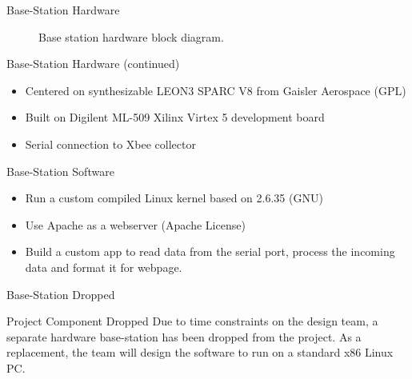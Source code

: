\documentclass{beamer}
\begin{document}
\begin{frame}{Base-Station Hardware}
	\begin{figure}[htbp]
	\begin{center}
	\caption{Base station hardware block diagram.}
	\label{fig:base_station_blocks}
	\end{center}
	\end{figure}
\end{frame}

\begin{frame}{Base-Station Hardware (continued)}
	\begin{itemize}
		\item <1 -> Centered on synthesizable LEON3 SPARC V8 from Gaisler Aerospace (GPL)
		\item <2 -> Built on Digilent ML-509 Xilinx Virtex 5 development board
		\item <3 -> Serial connection to Xbee collector
	\end{itemize}
\end{frame}

\begin{frame}{Base-Station Software}
	\begin{itemize}
		\item <1 -> Run a custom compiled Linux kernel based on 2.6.35 (GNU)
		\item <2 -> Use Apache as a webserver (Apache License)
		\item <3 -> Build a custom app to read data from the serial port, process the incoming data and format it for webpage.
	\end{itemize}
\end{frame}

\begin{frame}{Base-Station Dropped}
	\begin{alertblock}{Project Component Dropped}
		Due to time constraints on the design team, a separate hardware base-station has been dropped from the project. As a replacement, the team will design the software to run on a standard x86 Linux PC.
	\end{alertblock}
\end{frame}
\end{document}
